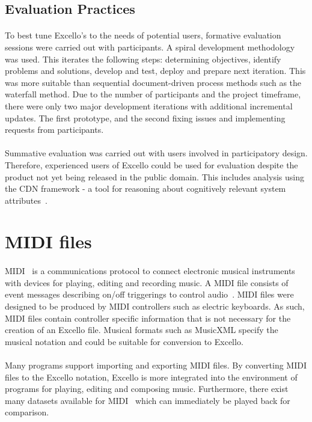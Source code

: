 \subsection{Evaluation Practices}

\paragraph{} To best tune Excello's to the needs of potential users, formative evaluation sessions were carried out with participants. A spiral development methodology~\cite{boehm:spiral} was used. This iterates the following steps: determining objectives, identify problems and solutions, develop and test, deploy and prepare next iteration. This was more suitable than sequential document-driven process methods such as the waterfall method. Due to the number of participants and the project timeframe, there were only two major development iterations with additional incremental updates. The first prototype, and the second fixing issues and implementing requests from participants.

\paragraph{} Summative evaluation was carried out with users involved in participatory design. Therefore, experienced users of Excello could be used for evaluation despite the product not yet being released in the public domain. This includes analysis using the CDN framework - a tool for reasoning about cognitively relevant system attributes~\cite{blackwell:tutorial}.

\section{MIDI files}

\paragraph{} MIDI~\cite{midiSpec} is a communications protocol to connect electronic musical instruments with devices for playing, editing and recording music. A MIDI file consists of event messages describing on/off triggerings to control audio~\cite{huber:midimanual}. MIDI files were designed to be produced by MIDI controllers such as electric keyboards. As such, MIDI files contain controller specific information that is not necessary for the creation of an Excello file. Musical formats such as MusicXML specify the musical notation and could be suitable for conversion to Excello.

\paragraph{} Many programs support importing and exporting MIDI files. By converting MIDI files to the Excello notation, Excello is more integrated into the environment of programs for playing, editing and composing music. Furthermore, there exist many datasets available for MIDI~\cite{huang:deep} which can immediately be played back for comparison.
